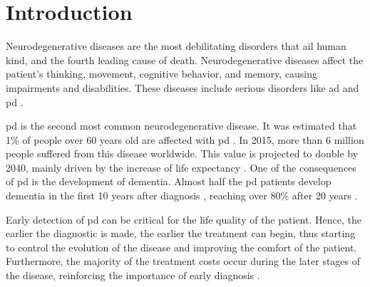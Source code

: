 
\chapter{Introduction}
\label{ch:lorem}




Neurodegenerative diseases are the most debilitating disorders that ail human kind, and the fourth leading cause of death. Neurodegenerative diseases affect the patient's thinking, movement, cognitive behavior, and memory, causing impairments and disabilities. These diseases include serious disorders like \gls{ad} and \gls{pd} \cite{parkinson_incidence}.

\gls{pd} is the second most common neurodegenerative disease. It was estimated that 1\% of people over 60 years old are affected with \gls{pd} \cite{epidemiology_pd}. In 2015, more than 6 million people suffered from this disease worldwide. This value is projected to double by 2040, mainly driven by the increase of life expectancy \cite{parkinson_worldwide}. One of the consequences of \gls{pd} is the development of dementia. Almost half the \gls{pd} patients develop dementia in the first 10 years after diagnosis \cite{parkinson_10_years}, reaching over 80\% after 20 years \cite{parkinson_20_years}.

Early detection of \gls{pd} can be critical for the life quality of the patient. Hence, the earlier the diagnostic is made, the earlier the treatment can begin, thus starting to control the evolution of the disease and improving the comfort of the patient. Furthermore, the majority of the treatment costs occur during the later stages of the disease, reinforcing the importance of early diagnosis \cite{parkinson_early}.

